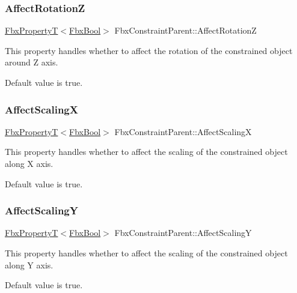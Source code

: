 \subsubsection{\texorpdfstring{Affect\+RotationZ}{AffectRotationZ}}
{\footnotesize\ttfamily \hyperlink{class_fbx_property_t}{Fbx\+PropertyT}$<$\hyperlink{fbxtypes_8h_a92e0562b2fe33e76a242f498b362262e}{Fbx\+Bool}$>$ Fbx\+Constraint\+Parent\+::\+Affect\+RotationZ}

This property handles whether to affect the rotation of the constrained object around Z axis.

Default value is true. \mbox{\label{class_fbx_constraint_parent_ab4f8c487608b32feff9804c7e70e851e}} 
\subsubsection{\texorpdfstring{Affect\+ScalingX}{AffectScalingX}}
{\footnotesize\ttfamily \hyperlink{class_fbx_property_t}{Fbx\+PropertyT}$<$\hyperlink{fbxtypes_8h_a92e0562b2fe33e76a242f498b362262e}{Fbx\+Bool}$>$ Fbx\+Constraint\+Parent\+::\+Affect\+ScalingX}

This property handles whether to affect the scaling of the constrained object along X axis.

Default value is true. \mbox{\label{class_fbx_constraint_parent_a32b210fd27c0e55456741428987755fe}} 
\subsubsection{\texorpdfstring{Affect\+ScalingY}{AffectScalingY}}
{\footnotesize\ttfamily \hyperlink{class_fbx_property_t}{Fbx\+PropertyT}$<$\hyperlink{fbxtypes_8h_a92e0562b2fe33e76a242f498b362262e}{Fbx\+Bool}$>$ Fbx\+Constraint\+Parent\+::\+Affect\+ScalingY}

This property handles whether to affect the scaling of the constrained object along Y axis.

Default value is true. \mbox{\label{class_fbx_constraint_parent_abbbb60d845ab61bede0b28f5a7defa22}} 
